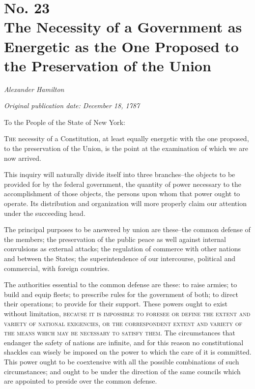 \chapter[No. 23: The Necessity of a Government as Energetic as the One Proposed to the Preservation of the Union]{No. 23\\ {\small The Necessity of a Government as Energetic as the One Proposed to the Preservation of the Union}}

\textit{Alexander Hamilton}

\textit{Original publication date: December 18, 1787}
\vspace{1cm}

To the People of the State of New York:
\vspace{.4cm}

\textsc{The} necessity of a Constitution, at least equally energetic with the one proposed, to the preservation of the Union, is the point at the examination of which we are now arrived.

This inquiry will naturally divide itself into three branches--the objects to be provided for by the federal government, the quantity of power necessary to the accomplishment of those objects, the persons upon whom that power ought to operate. 
Its distribution and organization will more properly claim our attention under the succeeding head.

The principal purposes to be answered by union are these--the common defense of the members; the preservation of the public peace as well against internal convulsions as external attacks; the regulation of commerce with other nations and between the States; the superintendence of our intercourse, political and commercial, with foreign countries.

The authorities essential to the common defense are these: to raise armies; to build and equip fleets; to prescribe rules for the government of both; to direct their operations; to provide for their support. 
These powers ought to exist without limitation, \textsc{because it is impossible to foresee or define the extent and variety of national exigencies}, \textsc{or the correspondent extent and variety of the means which may be necessary to satisfy them}. 
The circumstances that endanger the safety of nations are infinite, and for this reason no constitutional shackles can wisely be imposed on the power to which the care of it is committed. 
This power ought to be coextensive with all the possible combinations of such circumstances; and ought to be under the direction of the same councils which are appointed to preside over the common defense.

